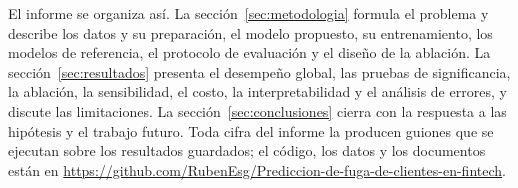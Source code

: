 El informe se organiza así. La sección~\ref{sec:metodologia} formula el problema y describe los datos y su
preparación, el modelo propuesto, su entrenamiento, los modelos de referencia, el protocolo de evaluación y el
diseño de la ablación. La sección~\ref{sec:resultados} presenta el desempeño global, las pruebas de
significancia, la ablación, la sensibilidad, el costo, la interpretabilidad y el análisis de errores, y discute
las limitaciones. La sección~\ref{sec:conclusiones} cierra con la respuesta a las hipótesis y el trabajo
futuro. Toda cifra del informe la producen guiones que se ejecutan sobre los resultados guardados; el código,
los datos y los documentos están en \url{https://github.com/RubenEsg/Prediccion-de-fuga-de-clientes-en-fintech}.
